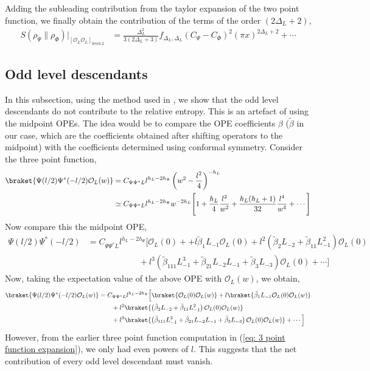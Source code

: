 \documentclass[11pt]{article}
\newcommand{\mO}{\mathcal{O}}
\newcommand{\nn}{\nonumber}
\newcommand{\lb}{\left(}
\newcommand{\rb}{\right)}
\begin{document}
Adding the subleading contribution from the taylor expansion of the two point function, we finally obtain the contribution of the terms of the order $(2\Delta_L+ 2)$, 
\begin{align}
    S(\rho_\Psi \|\rho_\Phi)\Big|_{[\mO_L\mO_L]_{\text{level-2}}}&= \frac{\Delta_L^2}{3(2\Delta_L +3)}f_{\Delta_L,\Delta_L} (C_\Psi - C_\Phi)^2(\pi x)^{2\Delta_L + 2} + \cdots
\end{align}
\subsection{Odd level descendants}
In this subsection, using the method used in \cite{yellowbook}, we show that the odd level descendants do not contribute to the relative entropy. This is an artefact of using the midpoint OPEs. The idea would be to compare the OPE coefficients $\beta$ ($\tilde\beta$ in our case, which are the coefficients obtained after shifting operators to the midpoint) with the coefficients determined using conformal symmetry. Consider the three point function,
\begin{align}
    \braket{\Psi(l/2) \Psi^*(-l/2) \mO_L(w)} &= C_{\Psi\Psi^*L}l^{h_L-2h_\Psi} \lb w^2 - \frac{l^2}{4}\rb^{-h_L}\\
    &\simeq C_{\Psi\Psi^*L} l^{h_L-2h_\Psi}w^{-2h_L}\Bigg[ 1+ \frac{h_L}{4}\frac{l^2}{w^2} + \frac{h_L (h_L+1)}{32}\frac{l^4}{w^4}  + \cdots \Bigg]\label{eq: 3 point function expansion}
\end{align}
Now compare this the midpoint OPE,
\begin{align}
    \Psi(l/2) \Psi^*(-l/2) &= C_{\Psi\Psi^*L}l^{h_L-2h_\Psi} \Big[ \mO_L(0) + + l\tilde\beta_1 L_{-1}\mO_L(0) + l^2 \lb \tilde\beta_2L_{-2}+ \tilde \beta_{11}L_{-1}^2\rb\mO_L(0) \nn \\ &\qquad\qquad\qquad+ l^3\lb \tilde \beta_{111}L_{-1}^3 + \tilde \beta_{21}L_{-2}L_{-1} +  \tilde \beta _{3}L_{-3} \rb\mO_L(0) +\cdots \Big]
\end{align}
Now, taking the expectation value of the above OPE with $\mO_L(w)$, we obtain,
\begin{align}
    \braket{\Psi(l/2) \Psi^*(-l/2) \mO_L(w)} &= C_{\Psi\Psi^*L}l^{h_L-2h_\Psi} \Big[ \braket{\mO_L(0)\mO_L(w)} + l\braket{\tilde \beta_1 L_{-1}\mO_L(0)\mO_L(w)} \nn \\
    &\qquad+ l^2 \braket{\lb \tilde\beta_2L_{-2}+ \tilde \beta_{11}L_{-1}^2\rb\mO_L(0)\mO_L(w)} \nn \\ &\qquad+ l^3\braket{\lb \tilde \beta_{111}L_{-1}^3 + \tilde \beta_{21}L_{-2}L_{-1} +  \tilde \beta _{3}L_{-3} \rb\mO_L(0)\mO_L(w)} + \cdots  \Big]
\end{align}
However, from the earlier three point function computation in (\ref{eq: 3 point function expansion}), we only had even powers of $l$. This suggests that the net contribution of every odd level descendant must vanish. 
\end{document}
